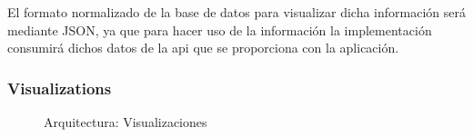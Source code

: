 El formato normalizado de la base de datos para visualizar dicha información será mediante JSON, ya que para hacer uso de la información la implementación consumirá dichos datos de la api que se proporciona con la aplicación.\\

\subsubsection{Visualizations}

\newpage
\begin{figure}[H]
  \caption{Arquitectura: Visualizaciones\\}
\end{figure}
